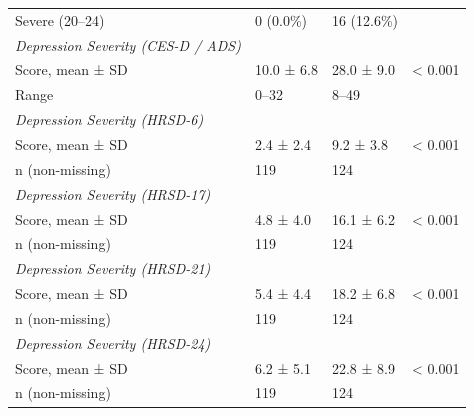 \begin{table}[ht]
\begin{tabular}{lllr}
\quad Severe (20–24) & 0 (0.0\%) & 16 (12.6\%) &  \\
\textit{Depression Severity (CES-D / ADS)} & & & \\
Score, mean ± SD & 10.0 ± 6.8 & 28.0 ± 9.0 & < 0.001 \\
\quad Range & 0–32 & 8–49 &  \\
\textit{Depression Severity (HRSD-6)} & & & \\
Score, mean ± SD & 2.4 ± 2.4 & 9.2 ± 3.8 & < 0.001 \\
\quad n (non-missing) & 119 & 124 &  \\
\textit{Depression Severity (HRSD-17)} & & & \\
Score, mean ± SD & 4.8 ± 4.0 & 16.1 ± 6.2 & < 0.001 \\
\quad n (non-missing) & 119 & 124 &  \\
\textit{Depression Severity (HRSD-21)} & & & \\
Score, mean ± SD & 5.4 ± 4.4 & 18.2 ± 6.8 & < 0.001 \\
\quad n (non-missing) & 119 & 124 &  \\
\textit{Depression Severity (HRSD-24)} & & & \\
Score, mean ± SD & 6.2 ± 5.1 & 22.8 ± 8.9 & < 0.001 \\
\quad n (non-missing) & 119 & 124 &  \\
\bottomrule
\end{tabular}
\end{table}